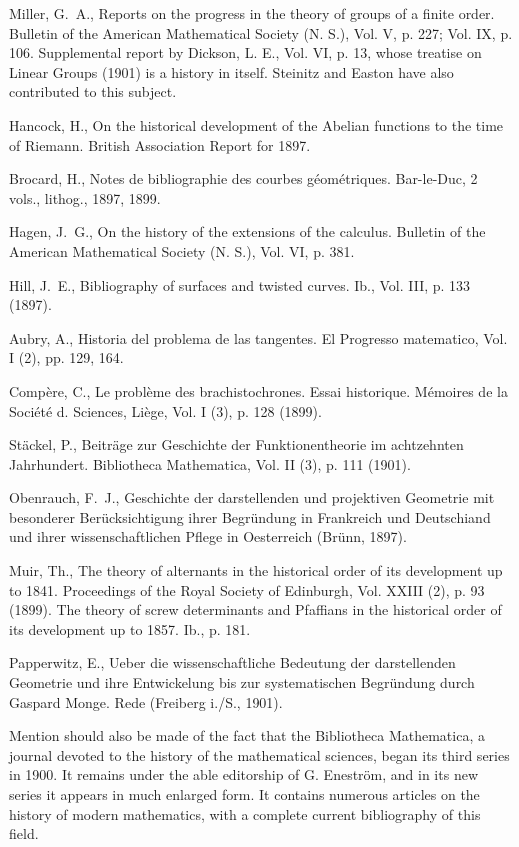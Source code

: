 \documentclass[oneside]{book}
\begin{document}
\bigskip

Miller, G.~A., Reports on the progress in the theory of groups of a
finite order. Bulletin of the American Mathematical Society (N. S.),
Vol. V, p. 227; Vol. IX, p. 106. Supplemental report by Dickson,
L. E., Vol. VI, p. 13, whose treatise on Linear Groups (1901) is a
history in itself. Steinitz and Easton have also contributed to this
subject.

Hancock, H., On the historical development of the Abelian functions
to the time of Riemann. British Association Report for 1897.

Brocard, H., Notes de bibliographie des courbes g\'eom\'etriques.
Bar-le-Duc, 2 vols., lithog., 1897, 1899.

Hagen, J.~G., On the history of the extensions of the calculus.
Bulletin of the American Mathematical Society (N. S.), Vol. VI,
p. 381.

Hill, J.~E., Bibliography of surfaces and twisted curves. Ib., Vol.
III, p. 133 (1897).

Aubry, A., Historia del problema de las tangentes. El Progresso
matematico, Vol. I (2), pp. 129, 164.

Comp\`ere, C., Le probl\`eme des brachistochrones. Essai historique.
M\'emoires de la Soci\'et\'e d. Sciences, Li\`ege, Vol. I (3),
p. 128 (1899).

St\"ackel, P., Beitr\"age zur Geschichte der Funktionentheorie im
achtzehnten Jahrhundert. Bibliotheca Mathematica, Vol. II (3),
p. 111 (1901).

Obenrauch, F.~J., Geschichte der darstellenden und projektiven
Geometrie mit besonderer Ber\"ucksichtigung ihrer Begr\"undung in
Frankreich und Deutschiand und ihrer wissenschaftlichen Pflege in
Oesterreich (Br\"unn, 1897).

Muir, Th., The theory of alternants in the historical order of its
development up to 1841. Proceedings of the Royal Society of
Edinburgh, Vol. XXIII (2), p. 93 (1899). The theory of screw
determinants and Pfaffians in the historical order of its
development up to 1857. Ib., p. 181.

Papperwitz, E., Ueber die wissenschaftliche Bedeutung der
darstellenden Geometrie und ihre Entwickelung bis zur
systematischen Begr\"undung durch Gaspard Monge. Rede (Freiberg
i./S., 1901).

\bigskip

Mention should also be made of the fact that the Bibliotheca
Mathematica, a journal devoted to the history of the mathematical
sciences, began its third series in 1900. It remains under the able
editorship of G. Enestr\"om, and in its new series it appears in
much enlarged form. It contains numerous articles on the history of
modern mathematics, with a complete current bibliography of this
field.
\end{document}
